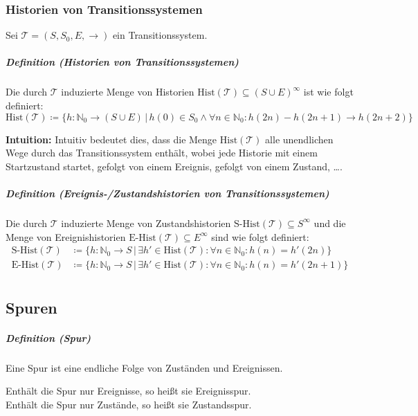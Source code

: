 \documentclass[a4paper, 11pt, accentcolor = tud3b]{tudreport}
\newcommand{\forwhich}{\ensuremath{{\,\vert\,}}}
\newcommand{\subsubparagraph}[1]{\hspace{1cm} \textbf{#1:}}
\newcommand{\definition}[2]{\subparagraph{Definition (#1)} #2}
\newcommand{\intuition}[1]{\subsubparagraph{Intuition} #1}
\begin{document}
			    \subsubsection{Historien von Transitionssystemen}
				    Sei $ \mathcal{T} = (S, S _ 0, E, \rightarrow) $ ein Transitionssystem.
				    
				    \definition{Historien von Transitionssystemen}{
					    Die durch $ \mathcal{T} $ induzierte Menge von Historien $ \text{Hist}(\mathcal{T}) \subseteq (S \cup E) ^ \infty $ ist wie folgt definiert:
					    \begin{equation*}
						    \text{Hist}(\mathcal{T}) \coloneqq \{ h : \mathbb{N} _ 0 \rightarrow (S \cup E) \forwhich h(0) \in S _ 0 \land \forall n \in \mathbb{N} _ 0 : h(2n) - h(2n + 1) \rightarrow h(2n + 2) \}
					    \end{equation*}
					    
					    \intuition{Intuitiv bedeutet dies, dass die Menge $ \text{Hist}(\mathcal{T}) $ alle unendlichen Wege durch das Transitionssystem enthält, wobei jede Historie mit einem Startzustand startet, gefolgt von einem Ereignis, gefolgt von einem Zustand, \dots.}
				    }
				    
				    \definition{Ereignis-/Zustandshistorien von Transitionssystemen}{
				    	Die durch $ \mathcal{T} $ induzierte Menge von Zustandshistorien $ \text{S-Hist}(\mathcal{T}) \subseteq S ^ \infty $ und die Menge von Ereignishistorien $ \text{E-Hist}(\mathcal{T}) \subseteq E ^ \infty $ sind wie folgt definiert:
				    	\begin{align*}
					    	\text{S-Hist}(\mathcal{T}) &\coloneqq \{ h : \mathbb{N} _ 0 \rightarrow S \forwhich \exists h' \in \text{Hist}(\mathcal{T}) : \forall n \in \mathbb{N} _ 0 : h(n) = h'(2n) \} \\
					    	\text{E-Hist}(\mathcal{T}) &\coloneqq \{ h : \mathbb{N} _ 0 \rightarrow S \forwhich \exists h' \in \text{Hist}(\mathcal{T}) : \forall n \in \mathbb{N} _ 0 : h(n) = h'(2n + 1) \} \\
				    	\end{align*}
				    }
		    
		    \subsection{Spuren}
			    \definition{Spur}{
			    	Eine Spur ist eine endliche Folge von Zuständen und Ereignissen.
			    	
			    	Enthält die Spur nur Ereignisse, so heißt sie Ereignisspur. \\
			    	Enthält die Spur nur Zustände, so heißt sie Zustandsspur.
			    }
			    
\end{document}
